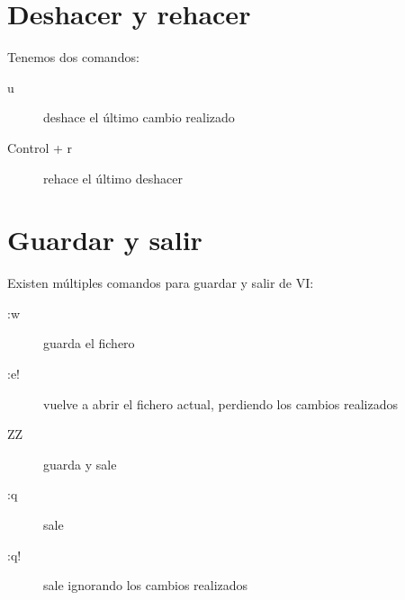 \section{Deshacer y rehacer} %
\label{sec:Deshacer y rehacer}

Tenemos dos comandos:

\begin{description}
    \item[u] deshace el último cambio realizado
    \item[Control + r] rehace el último deshacer
\end{description}


\section{Guardar y salir} %
\label{sec:Guardar y salir}

Existen múltiples comandos para guardar y salir de VI:

\begin{description}
    \item[:w] guarda el fichero
    \item[:e!] vuelve a abrir el fichero actual, perdiendo los cambios
    realizados
    \item[ZZ] guarda y sale
    \item[:q] sale
    \item[:q!] sale ignorando los cambios realizados
\end{description}


